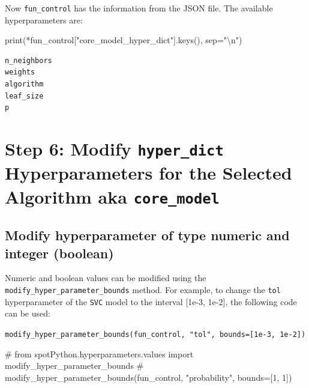 \documentclass[
  letterpaper,
  DIV=11,
  numbers=noendperiod]{scrreprt}
\newenvironment{Shaded}{\begin{snugshade}}{\end{snugshade}}
\newcommand{\BuiltInTok}[1]{\textcolor[rgb]{0.00,0.23,0.31}{#1}}
\newcommand{\CharTok}[1]{\textcolor[rgb]{0.13,0.47,0.30}{#1}}
\newcommand{\CommentTok}[1]{\textcolor[rgb]{0.37,0.37,0.37}{#1}}
\newcommand{\NormalTok}[1]{\textcolor[rgb]{0.00,0.23,0.31}{#1}}
\newcommand{\OperatorTok}[1]{\textcolor[rgb]{0.37,0.37,0.37}{#1}}
\newcommand{\StringTok}[1]{\textcolor[rgb]{0.13,0.47,0.30}{#1}}
\begin{document}
Now \texttt{fun\_control} has the information from the JSON file. The
available hyperparameters are:

\begin{Shaded}
\begin{Highlighting}[]
\BuiltInTok{print}\NormalTok{(}\OperatorTok{*}\NormalTok{fun\_control[}\StringTok{"core\_model\_hyper\_dict"}\NormalTok{].keys(), sep}\OperatorTok{=}\StringTok{"}\CharTok{\textbackslash{}n}\StringTok{"}\NormalTok{)}
\end{Highlighting}
\end{Shaded}

\begin{verbatim}
n_neighbors
weights
algorithm
leaf_size
p
\end{verbatim}

\hypertarget{step-6-modify-hyper_dict-hyperparameters-for-the-selected-algorithm-aka-core_model-4}{%
\section{\texorpdfstring{Step 6: Modify \texttt{hyper\_dict}
Hyperparameters for the Selected Algorithm aka
\texttt{core\_model}}{Step 6: Modify hyper\_dict Hyperparameters for the Selected Algorithm aka core\_model}}\label{step-6-modify-hyper_dict-hyperparameters-for-the-selected-algorithm-aka-core_model-4}}

\hypertarget{modify-hyperparameter-of-type-numeric-and-integer-boolean-4}{%
\subsection{Modify hyperparameter of type numeric and integer
(boolean)}\label{modify-hyperparameter-of-type-numeric-and-integer-boolean-4}}

Numeric and boolean values can be modified using the
\texttt{modify\_hyper\_parameter\_bounds} method. For example, to change
the \texttt{tol} hyperparameter of the \texttt{SVC} model to the
interval {[}1e-3, 1e-2{]}, the following code can be used:

\texttt{modify\_hyper\_parameter\_bounds(fun\_control,\ "tol",\ bounds={[}1e-3,\ 1e-2{]})}

\begin{Shaded}
\begin{Highlighting}[]
\CommentTok{\# from spotPython.hyperparameters.values import modify\_hyper\_parameter\_bounds}
\CommentTok{\# modify\_hyper\_parameter\_bounds(fun\_control, "probability", bounds=[1, 1])}
\end{Highlighting}
\end{Shaded}
\end{document}
